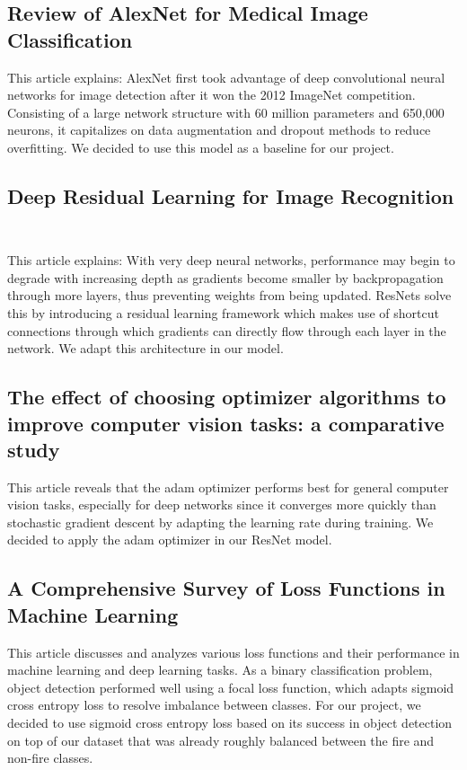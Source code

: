 \subsection{Review of AlexNet for Medical Image Classification~\citep{tang2023review}}

This article explains: AlexNet first took advantage of deep convolutional neural networks for image detection after it won the 2012 ImageNet competition. Consisting of a large network structure with 60 million parameters and 650,000 neurons, it capitalizes on data augmentation and dropout methods to reduce overfitting. We decided to use this model as a baseline for our project.

\subsection{Deep Residual Learning for Image Recognition
	~\citep{he2015deep}}

This article explains: With very deep neural networks, performance may begin to degrade with increasing depth as gradients become smaller by backpropagation through more layers, thus preventing weights from being updated. ResNets solve this by introducing a residual learning framework which makes use of shortcut connections through which gradients can directly flow through each layer in the network. We adapt this architecture in our model.

\subsection{The effect of choosing optimizer algorithms to improve computer vision tasks: a comparative study~\citep{Hassan}}

This article reveals that the adam optimizer performs best for general computer vision tasks, especially for deep networks since it converges more quickly than stochastic gradient descent by adapting the learning rate during training. We decided to apply the adam optimizer in our ResNet model.

\subsection{A Comprehensive Survey of Loss Functions in Machine Learning~\citep{Wang2022}}

This article discusses and analyzes various loss functions and their performance in machine learning and deep learning tasks. As a binary classification problem, object detection performed well using a focal loss function, which adapts sigmoid cross entropy loss to resolve imbalance between classes. For our project, we decided to use sigmoid cross entropy loss based on its success in object detection on top of our dataset that was already roughly balanced between the fire and non-fire classes.

